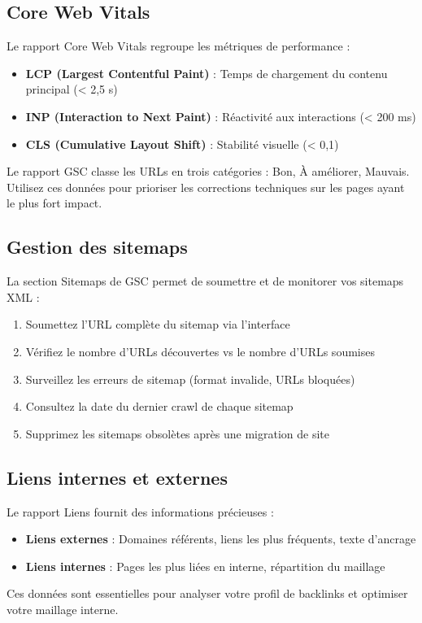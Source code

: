 \documentclass[12pt,a4paper,twoside]{report}
\begin{document}
\subsection{Core Web Vitals}

Le rapport Core Web Vitals regroupe les métriques de performance :

\begin{itemize}
    \item \textbf{LCP (Largest Contentful Paint)} : Temps de chargement du contenu principal (< 2,5 s)
    \item \textbf{INP (Interaction to Next Paint)} : Réactivité aux interactions (< 200 ms)
    \item \textbf{CLS (Cumulative Layout Shift)} : Stabilité visuelle (< 0,1)
\end{itemize}
Le rapport GSC classe les URLs en trois catégories : Bon, À améliorer, Mauvais. Utilisez ces données pour prioriser les corrections techniques sur les pages ayant le plus fort impact.

\subsection{Gestion des sitemaps}

La section Sitemaps de GSC permet de soumettre et de monitorer vos sitemaps XML :

\begin{enumerate}
    \item Soumettez l'URL complète du sitemap via l'interface
    \item Vérifiez le nombre d'URLs découvertes vs le nombre d'URLs soumises
    \item Surveillez les erreurs de sitemap (format invalide, URLs bloquées)
    \item Consultez la date du dernier crawl de chaque sitemap
    \item Supprimez les sitemaps obsolètes après une migration de site
\end{enumerate}

\subsection{Liens internes et externes}

Le rapport Liens fournit des informations précieuses :
\begin{itemize}
    \item \textbf{Liens externes} : Domaines référents, liens les plus fréquents, texte d'ancrage
    \item \textbf{Liens internes} : Pages les plus liées en interne, répartition du maillage
\end{itemize}
Ces données sont essentielles pour analyser votre profil de backlinks et optimiser votre maillage interne.
\end{document}
